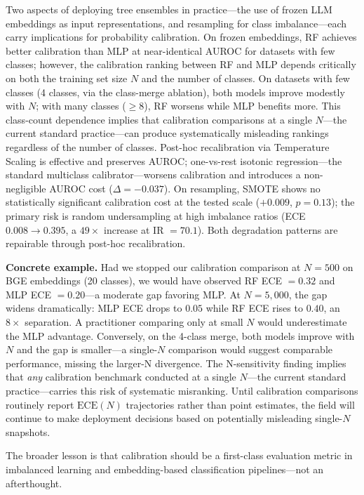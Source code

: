 \documentclass[11pt]{article}
\begin{document}
Two aspects of deploying tree ensembles in practice---the use of frozen LLM embeddings as input representations, and resampling for class imbalance---each carry implications for probability calibration. On frozen embeddings, RF achieves better calibration than MLP at near-identical AUROC for datasets with few classes; however, the calibration ranking between RF and MLP depends critically on both the training set size $N$ and the number of classes. On datasets with few classes (4 classes, via the class-merge ablation), both models improve modestly with $N$; with many classes (${\geq}8$), RF worsens while MLP benefits more. This class-count dependence implies that calibration comparisons at a single $N$---the current standard practice---can produce systematically misleading rankings regardless of the number of classes. Post-hoc recalibration via Temperature Scaling is effective and preserves AUROC; one-vs-rest isotonic regression---the standard multiclass calibrator---worsens calibration and introduces a non-negligible AUROC cost ($\Delta = -0.037$). On resampling, SMOTE shows no statistically significant calibration cost at the tested scale ($+0.009$, $p = 0.13$); the primary risk is random undersampling at high imbalance ratios (ECE $0.008 \to 0.395$, a $49\times$ increase at IR $=70.1$). Both degradation patterns are repairable through post-hoc recalibration.

\textbf{Concrete example.} Had we stopped our calibration comparison at $N{=}500$ on BGE embeddings (20 classes), we would have observed RF ECE $=0.32$ and MLP ECE $=0.20$---a moderate gap favoring MLP. At $N{=}5{,}000$, the gap widens dramatically: MLP ECE drops to $0.05$ while RF ECE rises to $0.40$, an $8\times$ separation. A practitioner comparing only at small $N$ would underestimate the MLP advantage. Conversely, on the 4-class merge, both models improve with $N$ and the gap is smaller---a single-$N$ comparison would suggest comparable performance, missing the larger-N divergence. The N-sensitivity finding implies that \textit{any} calibration benchmark conducted at a single $N$---the current standard practice---carries this risk of systematic misranking. Until calibration comparisons routinely report $\text{ECE}(N)$ trajectories rather than point estimates, the field will continue to make deployment decisions based on potentially misleading single-$N$ snapshots.

The broader lesson is that calibration should be a first-class evaluation metric in imbalanced learning and embedding-based classification pipelines---not an afterthought.
\end{document}
